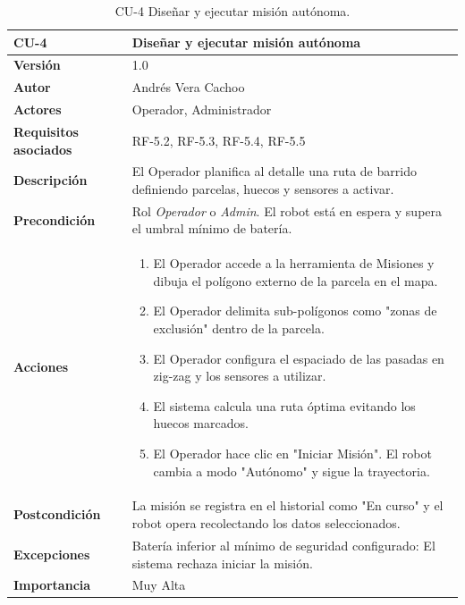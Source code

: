 \begin{table}[H]
	\centering
	\begin{tabularx}{\linewidth}{ p{} p{} }
		\toprule
		\textbf{CU-4}    & \textbf{Diseñar y ejecutar misión autónoma}\\
		\toprule
		\textbf{Versión}              & 1.0    \\
		\textbf{Autor}                & Andrés Vera Cachoo \\
		\textbf{Actores}              & Operador, Administrador \\
		\textbf{Requisitos asociados} & RF-5.2, RF-5.3, RF-5.4, RF-5.5 \\
		\textbf{Descripción}          & El Operador planifica al detalle una ruta de barrido definiendo parcelas, huecos y sensores a activar. \\
		\textbf{Precondición}         & Rol \textit{Operador} o \textit{Admin}. El robot está en espera y supera el umbral mínimo de batería. \\
		\textbf{Acciones}             &
		\begin{enumerate}
			\def\labelenumi{\arabic{enumi}.}
			\tightlist
			\item El Operador accede a la herramienta de Misiones y dibuja el polígono externo de la parcela en el mapa.
			\item El Operador delimita sub-polígonos como "zonas de exclusión" dentro de la parcela.
            \item El Operador configura el espaciado de las pasadas en zig-zag y los sensores a utilizar.
			\item El sistema calcula una ruta óptima evitando los huecos marcados.
            \item El Operador hace clic en "Iniciar Misión". El robot cambia a modo "Autónomo" y sigue la trayectoria.
		\end{enumerate}\\
		\textbf{Postcondición}        & La misión se registra en el historial como "En curso" y el robot opera recolectando los datos seleccionados. \\
		\textbf{Excepciones}          & Batería inferior al mínimo de seguridad configurado: El sistema rechaza iniciar la misión. \\
		\textbf{Importancia}          & Muy Alta \\
		\bottomrule
	\end{tabularx}
	\caption{CU-4 Diseñar y ejecutar misión autónoma.}
\end{table}

